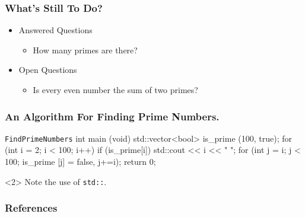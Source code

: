 \documentclass{beamer}
\begin{document}
  \begin{frame}[t]
    \frametitle{What's Still To Do?}
    \begin{itemize}
      \item Answered Questions
      \begin{itemize}
        \item How many primes are there?
      \end{itemize}
      \item Open Questions
      \begin{itemize}
        \item Is every even number the sum of two primes?
      \end{itemize}
    \end{itemize}
  \end{frame}
  
  \begin{frame}[fragile]
    \frametitle{An Algorithm For Finding Prime Numbers.}
    \begin{Code}[C++]{\texttt{FindPrimeNumbers}}
  int main (void)
  {
    std::vector<bool> is_prime (100, true);
    for (int i = 2; i < 100; i++)
    if (is_prime[i])
    {
      std::cout << i << " ";
      for (int j = i; j < 100; is_prime [j] = false, j+=i);
      }
      return 0;
  }
    \end{Code}
    \begin{uncoverenv}<2>
      Note the use of \verb|std::|.
    \end{uncoverenv}
  \end{frame}
  
  \nocite{*}
  \begin{frame}[allowframebreaks]
    \frametitle{References}
    \printbibliography
  \end{frame}
  
\end{document}
